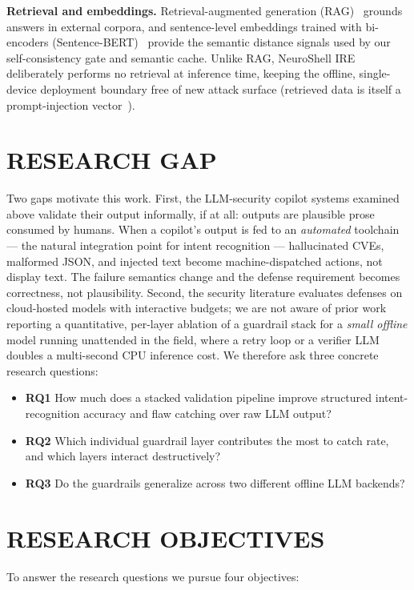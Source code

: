 \documentclass[conference]{IEEEtran}
\begin{document}
\textbf{Retrieval and embeddings.} Retrieval-augmented generation (RAG)~\cite{lewis2020rag} grounds answers in external corpora, and sentence-level embeddings trained with bi-encoders (Sentence-BERT)~\cite{reimers2019sbert} provide the semantic distance signals used by our self-consistency gate and semantic cache. Unlike RAG, NeuroShell IRE deliberately performs no retrieval at inference time, keeping the offline, single-device deployment boundary free of new attack surface (retrieved data is itself a prompt-injection vector~\cite{greshake2023indirect}).

\section{RESEARCH GAP}
Two gaps motivate this work. First, the LLM-security copilot systems examined above validate their output informally, if at all: outputs are plausible prose consumed by humans. When a copilot's output is fed to an \emph{automated} toolchain --- the natural integration point for intent recognition --- hallucinated CVEs, malformed JSON, and injected text become machine-dispatched actions, not display text. The failure semantics change and the defense requirement becomes correctness, not plausibility. Second, the security literature evaluates defenses on cloud-hosted models with interactive budgets; we are not aware of prior work reporting a quantitative, per-layer ablation of a guardrail stack for a \emph{small offline} model running unattended in the field, where a retry loop or a verifier LLM doubles a multi-second CPU inference cost. We therefore ask three concrete research questions:

\begin{itemize}
\item \textbf{RQ1} How much does a stacked validation pipeline improve structured intent-recognition accuracy and flaw catching over raw LLM output?
\item \textbf{RQ2} Which individual guardrail layer contributes the most to catch rate, and which layers interact destructively?
\item \textbf{RQ3} Do the guardrails generalize across two different offline LLM backends?
\end{itemize}

\section{RESEARCH OBJECTIVES}
To answer the research questions we pursue four objectives:
\end{document}
